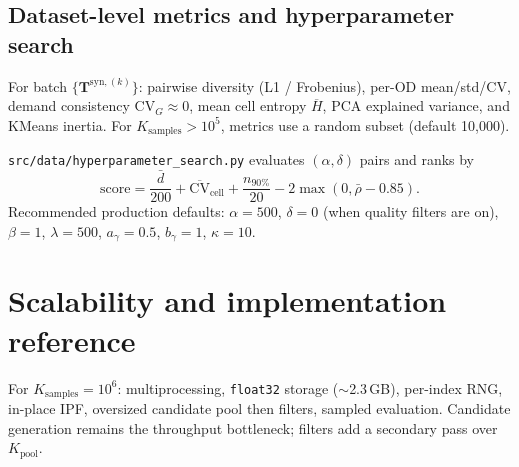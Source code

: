 \documentclass[11pt,a4paper]{report}
\newcommand{\Tsynk}[1]{\mathbf{T}^{\mathrm{syn},(#1)}}
\begin{document}
\subsection{Dataset-level metrics and hyperparameter search}

For batch $\{\Tsynk{k}\}$: pairwise diversity (L1 / Frobenius), per-OD mean/std/CV, demand consistency $\mathrm{CV}_G\approx 0$, mean cell entropy $\overline{H}$, PCA explained variance, and KMeans inertia. For $K_{\mathrm{samples}}>10^5$, metrics use a random subset (default 10{,}000).

\texttt{src/data/hyperparameter\_search.py} evaluates $(\alpha,\delta)$ pairs and ranks by
\begin{equation}
    \mathrm{score} = \frac{\bar{d}}{200} + \overline{\mathrm{CV}}_{\mathrm{cell}} + \frac{n_{90\%}}{20} - 2\max(0,\bar{\rho}-0.85).
\end{equation}
Recommended production defaults: $\alpha=500$, $\delta=0$ (when quality filters are on), $\beta=1$, $\lambda=500$, $a_{\gamma}=0.5$, $b_{\gamma}=1$, $\kappa=10$.


\section{Scalability and implementation reference}
\label{sec:ch1-impl}

For $K_{\mathrm{samples}}=10^6$: multiprocessing, \texttt{float32} storage ($\sim$2.3\,GB), per-index RNG, in-place IPF, oversized candidate pool then filters, sampled evaluation. Candidate generation remains the throughput bottleneck; filters add a secondary pass over $K_{\mathrm{pool}}$.
\end{document}
